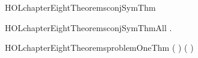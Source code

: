 \newcommand{\HOLchapterEightDate}{22 March 2020}
\newcommand{\HOLchapterEightTime}{01:31}
\begin{SaveVerbatim}{HOLchapterEightTheoremsconjSymThm}
\HOLTokenTurnstile{}  \HOLSymConst{\HOLTokenConj{}}  \HOLSymConst{\HOLTokenEquiv{}}  \HOLSymConst{\HOLTokenConj{}} 
\end{SaveVerbatim}
\newcommand{\HOLchapterEightTheoremsconjSymThm}{\UseVerbatim{HOLchapterEightTheoremsconjSymThm}}
\begin{SaveVerbatim}{HOLchapterEightTheoremsconjSymThmAll}
\HOLTokenTurnstile{} \HOLSymConst{\HOLTokenForall{}} .  \HOLSymConst{\HOLTokenConj{}}  \HOLSymConst{\HOLTokenEquiv{}}  \HOLSymConst{\HOLTokenConj{}} 
\end{SaveVerbatim}
\newcommand{\HOLchapterEightTheoremsconjSymThmAll}{\UseVerbatim{HOLchapterEightTheoremsconjSymThmAll}}
\begin{SaveVerbatim}{HOLchapterEightTheoremsproblemOneThm}
\HOLTokenTurnstile{}  \HOLSymConst{\HOLTokenImp{}} ( \HOLSymConst{\HOLTokenImp{}} ) \HOLSymConst{\HOLTokenImp{}} ( \HOLSymConst{\HOLTokenImp{}} ) \HOLSymConst{\HOLTokenImp{}} 
\end{SaveVerbatim}
\newcommand{\HOLchapterEightTheoremsproblemOneThm}{\UseVerbatim{HOLchapterEightTheoremsproblemOneThm}}
\newcommand{\HOLchapterEightTheorems}{
\HOLThmTag{chapter8}{conjSymThm}\HOLchapterEightTheoremsconjSymThm
\HOLThmTag{chapter8}{conjSymThmAll}\HOLchapterEightTheoremsconjSymThmAll
\HOLThmTag{chapter8}{problem1Thm}\HOLchapterEightTheoremsproblemOneThm
}
